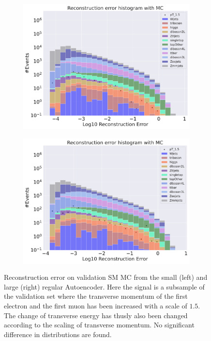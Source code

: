 \begin{figure}[h!]
    \centering
    \begin{subfigure}{.45\textwidth}
        \includegraphics[width=\textwidth]{Figures/AE_testing/small/b_data_recon_big_rm3_feats_sig_pT_1.5.pdf}
        \caption{ }
        \label{fig:ae_small_pt_1_5}
    \end{subfigure}
    \hfill 
    \begin{subfigure}{.45\textwidth}
        \includegraphics[width=\textwidth]{Figures/AE_testing/big/b_data_recon_big_rm3_feats_sig_pT_1.5.pdf}
        \caption{ }
        \label{fig:ae_big_pt_1_5}
    \end{subfigure}
    \hfill 
    \caption[AE | Reconstruction error $p_T$ altering of 1.5]{Reconstruction error on validation SM MC from the small (left) and large (right) regular Autoencoder. Here the signal is a subsample of the validation 
    set where the transverse momentum of the first electron and the first muon has been increased with a scale of $1.5$. The change of transverse 
    energy has thusly also been changed according to the scaling of transverse momentum. No significant difference in distributions are found. }
    \label{fig:ae_big_small_pt_1_5}
\end{figure}


